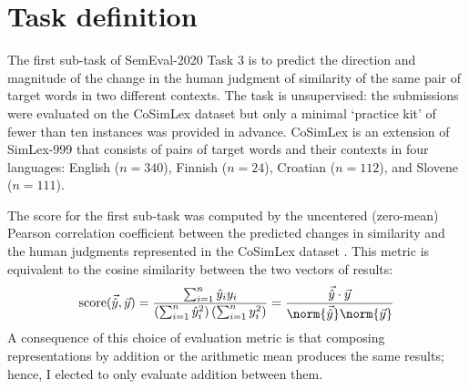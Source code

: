 \section{Task definition}
\label{task-definition}

The first sub-task of SemEval-2020 Task 3 is to predict the direction and magnitude of
the change in the human judgment of similarity of the same pair of target words in two
different contexts.
The task is unsupervised: the submissions were evaluated on the CoSimLex dataset
\parencite[39-42]{Armendariz2020} but only a minimal `practice kit' of fewer than ten
instances was provided in advance.
CoSimLex is an extension of SimLex-999 \parencite{Hill2015} that consists of pairs of
target words and their contexts in four languages: English ($n = 340$), Finnish
($n = 24$), Croatian ($n = 112$), and Slovene ($n = 111$).

The score for the first sub-task was computed by the uncentered (zero-mean) Pearson
correlation coefficient between the predicted changes in similarity and the human
judgments represented in the CoSimLex dataset \parencite[42]{Armendariz2020}.
This metric is equivalent to the cosine similarity between the two vectors of results:
\begin{equation}
  \text{score}(\vec{\hat{y}}, \vec{y})
  = \frac{\sum_{i = 1}^{n} \hat{y}_i y_i}{\left( \sum_{i = 1}^{n} \hat{y}_i^2 \right)\left( \sum_{i = 1}^{n} y_i^2 \right)}
  = \frac{\vec{\hat{y}} \cdot \vec{y}}{\norm{\vec{\hat{y}}} \norm{\vec{y}}}
\end{equation}
A consequence of this choice of evaluation metric is that composing representations by
addition or the arithmetic mean produces the same results; hence, I elected to only
evaluate addition between them.
